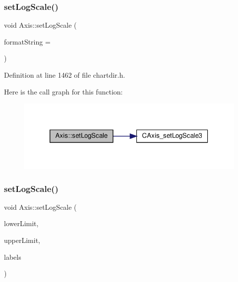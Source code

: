 \subsubsection{\texorpdfstring{set\+Log\+Scale()}{setLogScale()}\hspace{0.1cm}{\footnotesize\ttfamily [2/4]}}
{\footnotesize\ttfamily void Axis\+::set\+Log\+Scale (\begin{DoxyParamCaption}\item[{const char $\ast$}]{format\+String = {} }\end{DoxyParamCaption})\hspace{0.3cm}{\ttfamily [inline]}}



Definition at line 1462 of file chartdir.\+h.

Here is the call graph for this function\+:
\nopagebreak
\begin{figure}[H]
\begin{center}
\leavevmode
\includegraphics[width=320pt]{class_axis_a344d2266d15c80d455e5cc9cd9e8b601_cgraph}
\end{center}
\end{figure}
\mbox{\label{class_axis_a38921521a2868738d43f444f6061400c}} 
\subsubsection{\texorpdfstring{set\+Log\+Scale()}{setLogScale()}\hspace{0.1cm}{\footnotesize\ttfamily [3/4]}}
{\footnotesize\ttfamily void Axis\+::set\+Log\+Scale (\begin{DoxyParamCaption}\item[{double}]{lower\+Limit,  }\item[{double}]{upper\+Limit,  }\item[{\hyperlink{class_string_array}{String\+Array}}]{labels }\end{DoxyParamCaption})\hspace{0.3cm}{\ttfamily [inline]}}



